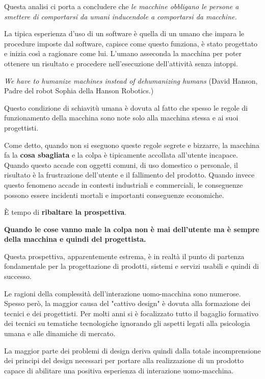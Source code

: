 Questa analisi ci porta a concludere che \textit{le macchine obbligano le persone a smettere di comportarsi da umani inducendole a comportarsi da macchine.}

La tipica esperienza d'uso di un software è quella di un umano che impara le procedure imposte dal software, capisce come questo funziona, è stato progettato e inizia così a ragionare come lui. L'umano asseconda la macchina per poter ottenere un risultato e procedere nell'esecuzione dell'attività senza intoppi.

\begin{flushleft}
	\textit{We have to humanize machines instead of dehumanizing humans} (David Hanson, Padre del robot Sophia della Hanson Robotics.)
\end{flushleft}

Questo condizione di schiavitù umana è dovuta al fatto che spesso le regole di funzionamento della macchina sono note solo alla macchina stessa e ai suoi progettisti. 

Come detto, quando non si eseguono queste regole segrete e bizzarre, la macchina fa la \textbf{cosa sbagliata} e la colpa è tipicamente accollata all'utente incapace. Quando questo accade con oggetti comuni, di uso domestico o personale, il risultato è la frustrazione dell'utente e il fallimento del prodotto. Quando invece questo fenomeno accade in contesti industriali e commerciali, le conseguenze possono essere incidenti mortali e importanti conseguenze economiche.

È tempo di \textbf{ribaltare la prospettiva}. 

\begin{flushleft}
	\textbf{Quando le cose vanno male la colpa non è mai dell'utente ma è sempre della macchina e quindi del progettista.}
\end{flushleft}

Questa prospettiva, apparentemente estrema, è in realtà il punto di partenza fondamentale per la progettazione di prodotti, sistemi e servizi usabili e quindi di successo. 

Le ragioni della complessità dell'interazione uomo-macchina sono numerose. Spesso però, la maggior causa del "cattivo design" è dovuta alla formazione dei tecnici e dei progettisti. Per molti anni si è focalizzato tutto il bagaglio formativo dei tecnici su tematiche tecnologiche ignorando gli aspetti legati alla psicologia umana e alle dinamiche di mercato.

La maggior parte dei problemi di design deriva quindi dalla totale incomprensione dei principi del design necessari per portare alla realizzazione di un prodotto capace di abilitare una positiva esperienza di interazione uomo-macchina.

